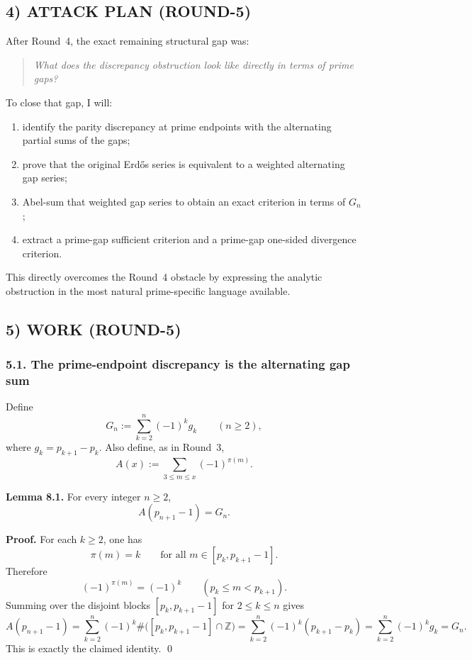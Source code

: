 \subsection*{4) ATTACK PLAN (ROUND-5)}

After Round~4, the exact remaining structural gap was:
\begin{quote}
\emph{What does the discrepancy obstruction look like directly in terms of prime gaps?}
\end{quote}

To close that gap, I will:
\begin{enumerate}
\item identify the parity discrepancy at prime endpoints with the alternating partial sums of the gaps;
\item prove that the original Erd\H{o}s series is equivalent to a weighted alternating gap series;
\item Abel-sum that weighted gap series to obtain an exact criterion in terms of $G_n$;
\item extract a prime-gap sufficient criterion and a prime-gap one-sided divergence criterion.
\end{enumerate}

This directly overcomes the Round~4 obstacle by expressing the analytic obstruction in the most natural prime-specific language available.

\subsection*{5) WORK (ROUND-5)}

\subsubsection*{5.1. The prime-endpoint discrepancy is the alternating gap sum}

Define
\[
G_n:=\sum_{k=2}^n (-1)^k g_k
\qquad (n\ge 2),
\]
where $g_k=p_{k+1}-p_k$.
Also define, as in Round~3,
\[
A(x):=\sum_{3\le m\le x} (-1)^{\pi(m)}.
\]

\textbf{Lemma 8.1.}
For every integer $n\ge 2$,
\[
A(p_{n+1}-1)=G_n.
\]

\textbf{Proof.}
For each $k\ge 2$, one has
\[
\pi(m)=k \qquad \text{for all } m\in [p_k,p_{k+1}-1].
\]
Therefore
\[
(-1)^{\pi(m)}=(-1)^k \qquad (p_k\le m<p_{k+1}).
\]
Summing over the disjoint blocks $[p_k,p_{k+1}-1]$ for $2\le k\le n$ gives
\[
A(p_{n+1}-1)
=
\sum_{k=2}^n (-1)^k \#\bigl([p_k,p_{k+1}-1]\cap\mathbb Z\bigr)
=
\sum_{k=2}^n (-1)^k (p_{k+1}-p_k)
=
\sum_{k=2}^n (-1)^k g_k
=G_n.
\]
This is exactly the claimed identity. \qed

